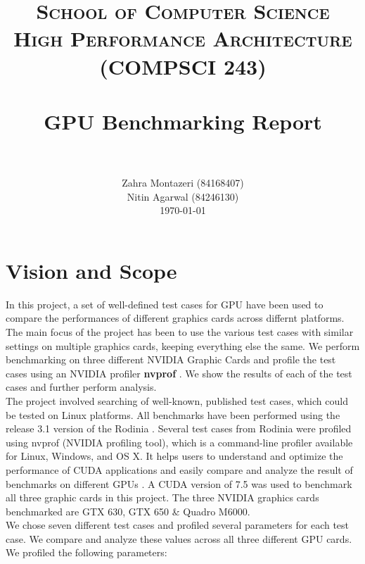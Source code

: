 \documentclass[paper=a4, fontsize=11pt]{scrartcl}
\title{
		\usefont{OT1}{bch}{b}{n}
		\normalfont \normalsize \textsc{School of Computer Science} \\ 
        \normalsize \textsc{High Performance Architecture (COMPSCI 243)} \\
        [25pt]
		\horrule{0.5pt} \\[0.4cm]
		\huge GPU Benchmarking Report \\
		\horrule{2pt} \\[0.5cm]
}
\author{
		\normalfont 								
        \normalsize
        Zahra Montazeri (84168407) \\[-3pt]		
        \normalsize 
        \newline
        \normalsize
        Nitin Agarwal (84246130) \\[-3pt]		
        \normalsize 
        \newline
        \newline
        \today
}
\date{}
\numberwithin{equation}{section}		%
\numberwithin{figure}{section}			%
\numberwithin{table}{section}				%
\begin{document}
\maketitle
\newpage
\tableofcontents
\newpage
\section{Vision and Scope}
In this project, a set of well-defined test cases for GPU have been used to compare the performances of different graphics cards across differnt platforms. The main focus of the project has been to use the various test cases with similar settings on multiple graphics cards, keeping everything else the same. We perform benchmarking on three different NVIDIA Graphic Cards and profile the test cases using an NVIDIA profiler \textbf{nvprof} \cite{nvprof}. We show the results of each of the test cases and further perform analysis.\\

The project involved searching of well-known, published test cases, which could be tested on Linux platforms. All benchmarks have been performed using the release 3.1 version of the Rodinia \cite{rodinia}. Several test cases from Rodinia were profiled using nvprof (NVIDIA profiling tool), which is a command-line profiler available for Linux, Windows, and OS X. It helps users to understand and optimize the performance of CUDA applications and easily compare and analyze the result of benchmarks on different GPUs \cite{CUDA}. A CUDA version of 7.5 was used to benchmark all three graphic cards in this project. The three NVIDIA graphics cards benchmarked are GTX 630, GTX 650 \& Quadro M6000.\\

We chose seven different test cases and profiled several parameters for each test case. We compare and analyze these values across all three different GPU cards. We profiled the following parameters:
\end{document}
